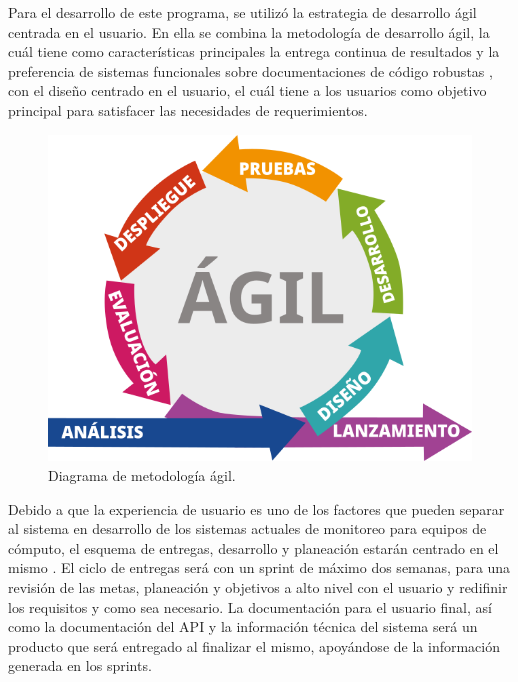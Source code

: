Para el desarrollo de este programa, se utilizó la estrategia de desarrollo ágil centrada en el usuario. En ella se combina la metodología de desarrollo ágil, la cuál tiene como características principales la entrega continua de resultados y la preferencia de sistemas funcionales sobre documentaciones de código robustas \cite{agile_manifesto}, con el diseño centrado en el usuario, el cuál tiene a los usuarios como objetivo principal para satisfacer las necesidades de requerimientos.

\begin{figure}[!ht]
	\centering
	\includegraphics[width=.75\linewidth]{images/diagrams/metodologia_agil.png}
	\caption{Diagrama de metodología ágil.}
	\label{fig:agile_methodology}
\end{figure}

Debido a que la experiencia de usuario es uno de los factores que pueden separar al sistema en desarrollo de los sistemas actuales de monitoreo para equipos de cómputo, el esquema de entregas, desarrollo y planeación estarán centrado en el mismo \cite{hussain_agile_usercentered}. El ciclo de entregas será con un sprint de máximo dos semanas, para una revisión de las metas, planeación y objetivos a alto nivel con el usuario y redifinir los requisitos y como sea necesario. La documentación para el usuario final, así como la documentación del API y la información técnica del sistema será un producto que será entregado al finalizar el mismo, apoyándose de la información generada en los sprints.





